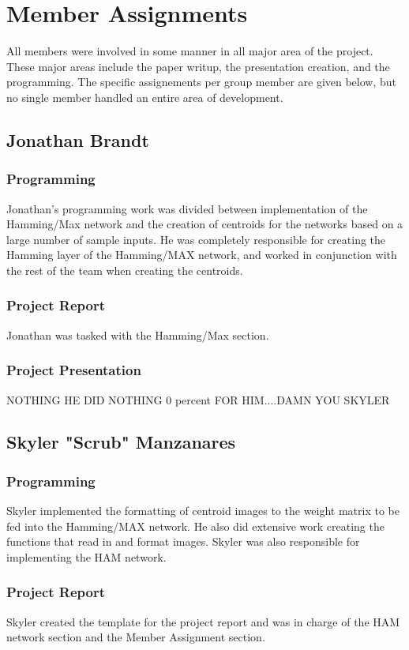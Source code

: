\documentclass{article}
\begin{document}
 
\section{Member Assignments}
All members were involved in some manner in all major area of the project. These
major areas include the paper writup, the presentation creation, and the 
programming. The specific assignements per group member are given below, but no
single member handled an entire area of development.
\subsection{Jonathan Brandt}
\subsubsection{Programming}
Jonathan's programming work was divided between implementation of the 
Hamming/Max network and the creation of centroids for the networks based on a
large number of sample inputs. He was completely responsible for creating the Hamming layer of the Hamming/MAX network, and worked in conjunction with the rest of the team when creating the centroids. 

\subsubsection{Project Report}
Jonathan was tasked with the Hamming/Max section.

\subsubsection{Project Presentation}
NOTHING HE DID NOTHING 0 percent FOR HIM....DAMN YOU SKYLER

\subsection{Skyler "Scrub" Manzanares}
\subsubsection{Programming}
Skyler implemented the formatting of centroid images to the weight matrix to be fed into the Hamming/MAX network. He also did extensive work creating the functions that read in and format images. Skyler was also responsible for implementing
the HAM network.

\subsubsection{Project Report}
Skyler created the template for the project report and was in charge of the HAM 
network section and the Member Assignment section.
\end{document}
